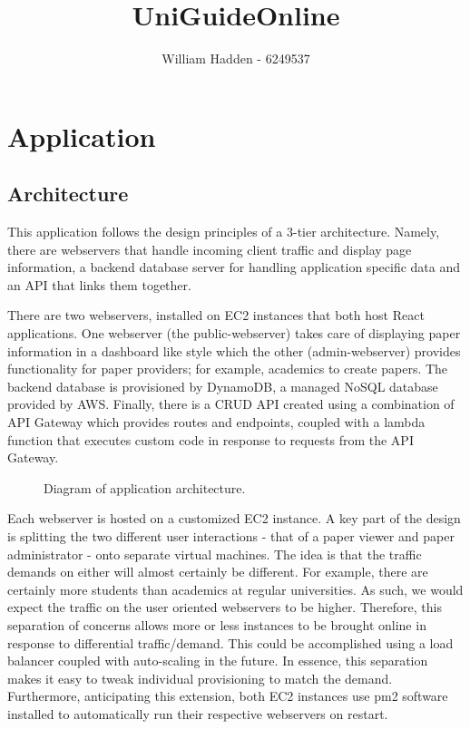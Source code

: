 \documentclass[12pt]{article}
\begin{document}
\title{UniGuideOnline \\ }

\author{William Hadden - 6249537} 

\maketitle

\section{Application}
\subsection{Architecture}

This application follows the design principles of a 3-tier architecture. Namely, there are webservers that handle incoming client traffic and display page information, a backend database server for handling application specific data and an API that links them together.

There are two webservers, installed on EC2 instances that both host React applications. One webserver (the public-webserver) takes care of displaying paper information in a dashboard like style which the other (admin-webserver) provides functionality for paper providers; for example, academics to create papers. The backend database is provisioned by DynamoDB, a managed NoSQL database provided by AWS. Finally, there is a CRUD API created using a combination of API Gateway which provides routes and endpoints, coupled with a lambda function that executes custom code in response to requests from the API Gateway. 

\begin{figure}
    \caption{Diagram of application architecture.}
    \label{fig: application_architecutre}
\end{figure}

Each webserver is hosted on a customized EC2 instance. A key part of the design is splitting the two different user interactions - that of a paper viewer and paper administrator - onto separate virtual machines. The idea is that the traffic demands on either will almost certainly be different. For example, there are certainly more students than academics at regular universities. As such, we would expect the traffic on the user oriented webservers to be higher. Therefore, this separation of concerns allows more or less instances to be brought online in response to differential traffic/demand. This could be accomplished using a load balancer coupled with auto-scaling in the future. In essence, this separation makes it easy to tweak individual provisioning to match the demand. 
Furthermore, anticipating this extension, both EC2 instances use pm2 software installed to automatically run their respective webservers on restart. 
\end{document}
